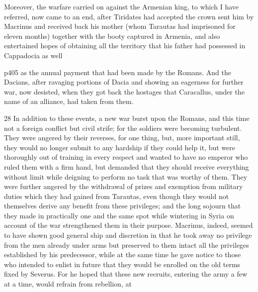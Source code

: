 Moreover, the warfare carried on against the Armenian king, to which I have referred, now came to an end, after Tiridates had accepted the crown sent him by Macrinus and received back his mother (whom Tarautas had imprisoned for eleven months) together with the booty captured in Armenia, and also entertained hopes of obtaining all the territory that his father had possessed in Cappadocia as well

p405 as the annual payment that had been made by the Romans. And the Dacians, after ravaging portions of Dacia and showing an eagerness for further war, now desisted, when they got back the hostages that Caracallus, under the name of an alliance, had taken from them.

28
In addition to these events, a new war burst upon the Romans, and this time not a foreign conflict but civil strife; for the soldiers were becoming turbulent. They were angered by their reverses, for one thing, but, more important still, they would no longer submit to any hardship if they could help it, but were thoroughly out of training in every respect and wanted to have no emperor who ruled them with a firm hand, but demanded that they should receive everything without limit while deigning to perform no task that was worthy of them. They were further angered by the withdrawal of prizes and exemption from military duties which they had gained from Tarautas, even though they would not themselves derive any benefit from these privileges; and the long sojourn that they made in practically one and the same spot while wintering in Syria on account of the war strengthened them in their purpose. Macrinus, indeed, seemed to have shown good general ­ship and discretion in that he took away no privilege from the men already under arms but preserved to them intact all the privileges established by his predecessor, while at the same time he gave notice to those who intended to enlist in future that they would be enrolled on the old terms fixed by Severus. For he hoped that these new recruits, entering the army a few at a time, would refrain from rebellion, at

